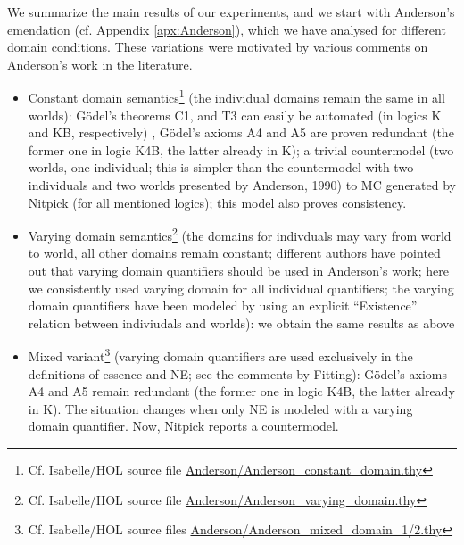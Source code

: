 \documentclass{birkjour}
\theoremstyle{definition}
\theoremstyle{remark}
\numberwithin{equation}{section}
\begin{document}
We summarize the main results of our experiments, and we start with
Anderson's emendation (cf. Appendix \ref{apx:Anderson}), which we have
analysed for different domain conditions. These variations were
motivated by various comments on Anderson's work in the literature. 
\begin{itemize}
\item Constant domain semantics\footnote{Cf. Isabelle/HOL source file
    \url{Anderson/Anderson_constant_domain.thy}} (the individual
  domains remain the same in all worlds): G\"odel's theorems C1, and
  T3 can easily be automated (in logics K and KB, respectively) ,
  G\"odel's axioms A4 and A5 are proven redundant (the former one in
  logic K4B, the latter already in K); a trivial countermodel (two
  worlds, one individual; this is simpler than
          the countermodel with two individuals and two worlds
          presented by Anderson, 1990) to MC generated by Nitpick (for all mentioned
  logics); this model also proves consistency.
\item Varying domain semantics\footnote{Cf. Isabelle/HOL source file
    \url{Anderson/Anderson_varying_domain.thy}} (the domains for
  indivduals may vary from world to world, all other domains remain
  constant; different authors have pointed out that varying domain
  quantifiers should be used in Anderson's work; here we consistently
  used varying domain for all individual quantifiers; the varying
  domain quantifiers have been modeled by using an explicit
  ``Existence'' relation between indiviudals and worlds): we obtain
  the same results as  above
\item Mixed variant\footnote{Cf. Isabelle/HOL source files
    \url{Anderson/Anderson_mixed_domain_1/2.thy}} (varying domain
  quantifiers are used exclusively in the definitions of essence and
  NE; see the comments by Fitting): G\"odel's axioms A4 and A5 remain
  redundant (the former one in
  logic K4B, the latter already in K). The situation changes when only
  NE is modeled with a varying domain quantifier. Now, Nitpick reports
  a countermodel. 
\end{itemize}
 








\end{document}

